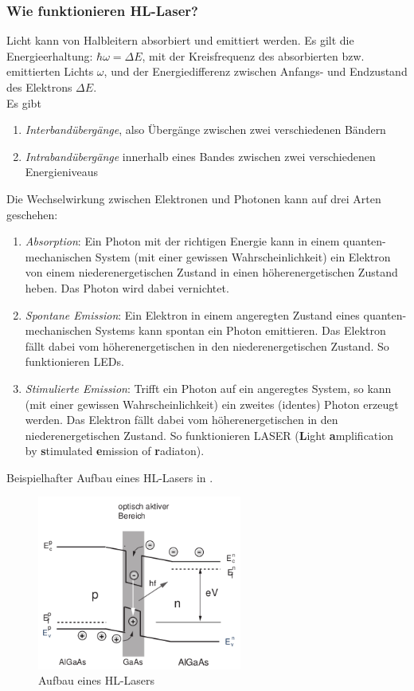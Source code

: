 \documentclass{article}
\begin{document}
    \subsubsection{Wie funktionieren HL-Laser?}
    Licht kann von Halbleitern absorbiert und emittiert werden.
    Es gilt die Energieerhaltung: $\hbar \omega = \Delta E$, mit der Kreisfrequenz des absorbierten bzw. emittierten Lichts $\omega$,
    und der Energiedifferenz zwischen Anfangs- und Endzustand des Elektrons $\Delta E$.\\
    Es gibt
    \begin{enumerate}
        \item \emph{Interband\"uberg\"ange}, also \"Uberg\"ange zwischen zwei verschiedenen B\"andern
        \item \emph{Intraband\"uberg\"ange} innerhalb eines Bandes zwischen zwei verschiedenen Energieniveaus
    \end{enumerate}
    Die Wechselwirkung zwischen Elektronen und Photonen kann auf drei Arten geschehen:
    \begin{enumerate}
        \item \emph{Absorption}: Ein Photon mit der richtigen Energie kann in einem quanten-mechanischen System (mit einer gewissen Wahrscheinlichkeit) ein Elektron von einem niederenergetischen Zustand in einen höherenergetischen Zustand heben. Das Photon wird
        dabei vernichtet.
        \item \emph{Spontane Emission}: Ein Elektron in einem angeregten Zustand eines quanten-mechanischen Systems kann spontan ein Photon emittieren. Das Elektron fällt dabei vom höherenergetischen in den niederenergetischen Zustand. So funktionieren LEDs.
        \item \emph{Stimulierte Emission}: Trifft ein Photon auf ein angeregtes System, so kann (mit einer gewissen Wahrscheinlichkeit) ein zweites (identes) Photon erzeugt werden. Das Elektron fällt dabei vom höherenergetischen in den niederenergetischen Zustand.
        So funktionieren LASER (\textbf{L}ight \textbf{a}mplification by \textbf{s}timulated \textbf{e}mission of \textbf{r}adiaton).
    \end{enumerate}
    Beispielhafter Aufbau eines HL-Lasers in .
    \begin{figure}[H]
        \centering
        \includegraphics[width=0.6\textwidth]{fig/hlLaser}
        \caption{Aufbau eines HL-Lasers}
        \label{fig:hlLaser}
    \end{figure}
\end{document}
